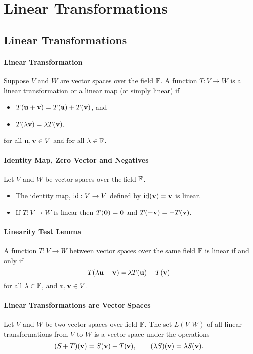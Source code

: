 \section{Linear Transformations}

\subsection{Linear Transformations}
\paragraph{Linear Transformation}
Suppose \(V\) and \(W\) are vector spaces over the field \(\mathbb{F}\). A function \(T: V \to W\) is a linear transformation or a linear map (or simply linear) if
\begin{itemize}
    \item \(T(\mathbf{u} + \mathbf{v}) = T(\mathbf{u}) + T(\mathbf{v})\), and
    \item \(T(\lambda\mathbf{v}) = \lambda T(\mathbf{v})\),
\end{itemize}
for all \(\mathbf{u}, \mathbf{v} \in V\) and for all \(\lambda \in \mathbb{F}\).

\paragraph{Identity Map, Zero Vector and Negatives}
Let \(V\) and \(W\) be vector spaces over the field \(\mathbb{F}\).
\begin{itemize}
    \item The identity map, \(\mathrm{id}:V \to V\) defined by \(\mathrm{id}(\mathbf{v}) = \mathbf{v}\) is linear.
    \item If \(T: V \to W\) is linear then \(T(\mathbf{0}) = \mathbf{0}\) and \(T(-\mathbf{v}) = -T(\mathbf{v})\).
\end{itemize}

\paragraph{Linearity Test Lemma}
A function \(T: V \to W\) between vector spaces over the same field \(\mathbb{F}\) is linear if and only if 
\[T(\lambda\mathbf{u} + \mathbf{v}) = \lambda T(\mathbf{u}) + T(\mathbf{v})\]
for all \(\lambda \in \mathbb{F}\), and \(\mathbf{u}, \mathbf{v} \in V\).

\paragraph{Linear Transformations are Vector Spaces}
Let \(V\) and \(W\) be two vector spaces over field \(\mathbb{F}\). The set \(L(V,W)\) of all linear transformations from \(V\) to \(W\) is a vector space under the operations
\[(S+T)(\mathbf{v}) = S(\mathbf{v}) + T(\mathbf{v}), \qquad (\lambda S)(\mathbf{v}) = \lambda S(\mathbf{v}).\]

